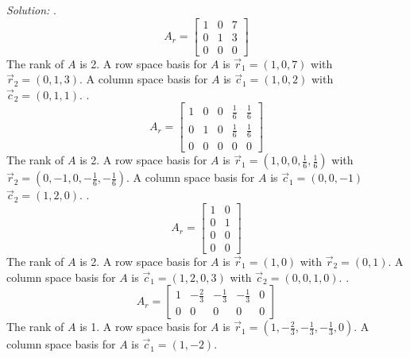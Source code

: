 \documentclass[11pt]{homework}
\begin{document}
\emph{Solution:}
.
\begin{equation*}
A_r =
  \begin{bmatrix}
  1 & 0 & 7 \\
  0 & 1 & 3 \\
  0 & 0 & 0
  \end{bmatrix}
\end{equation*}
The rank of $A$ is 2. 
A row space basis for $A$ is 
$\vec r_1 = (1, 0, 7)$ with 
$\vec r_2 = (0, 1, 3)$.
A column space basis for $A$ is
$\vec c_1 = (1, 0, 2)$ with
$\vec c_2 = (0, 1, 1)$.
\newline
{}.
\begin{equation*}
A_r =
  \begin{bmatrix}
   1 & 0 & 0 & \frac{1}{6} & \frac{1}{6}\\
   0 & 1 & 0 & \frac{1}{6} & \frac{1}{6}\\
   0 & 0 & 0 &0 &0 
  \end{bmatrix}
\end{equation*}
The rank of $A$ is 2.
A row space basis for $A$ is 
$\vec r_1 = (1,0, 0, \frac{1}{6}, \frac{1}{6})$ with
$\vec r_2 = (0, -1, 0, -\frac{1}{6}, -\frac{1}{6})$.
A column space basis for $A$ is
$\vec c_1 = ( 0,0,-1)$
$\vec c_2 = (1,2,0)$.
\newline
{}. 
\begin{equation*}
A_r = 
  \begin{bmatrix}
  1 & 0 \\
  0 & 1 \\
  0 & 0 \\
  0 & 0 
  \end{bmatrix}
\end{equation*}
The rank of $A$ is 2.
A row space basis for $A$ is
$\vec r_1 = (1,0)$ with
$\vec r_2 = (0,1)$.
A column space basis for $A$ is
$\vec c_1 = (1,2, 0, 3)$ with
$\vec c_2 = (0, 0, 1, 0)$.
\newline
{}.
\begin{equation*}
A_r =
  \begin{bmatrix}
  1 & -\frac{2}{3} & -\frac{1}{3} & -\frac{1}{3} & 0 \\
  0& 0& 0& 0& 0 
  \end{bmatrix}
\end{equation*}
The rank of $A$ is 1.
A row space basis for $A$ is
$\vec r_1 = ( 1 , -\frac{2}{3} , -\frac{1}{3} , -\frac{1}{3} , 0 )$.
A column space basis for $A$ is
$\vec c_1 = (1, -2)$.
\end{document}
